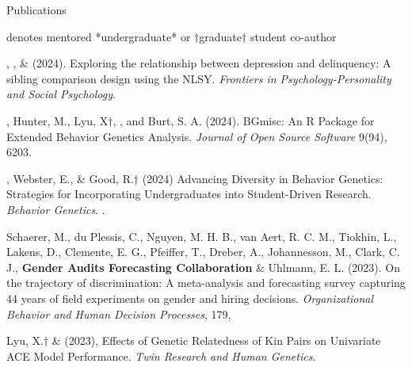 \begin{rSection}{\textrm{Publications}}%
\vspace{-1mm}\begin{center}\footnotesize{denotes mentored *undergraduate* or $\dagger$graduate$\dagger$ student co-author}\end{center}\vspace{-1mm}
\begin{etaremune}

\item \emsims, \jt, \& \meb (2024). Exploring the relationship between depression and delinquency: A sibling comparison design using the NLSY.  \textit{Frontiers in Psychology-Personality and Social Psychology}. 

\item \meb, Hunter, M., Lyu, X$\dagger$, \jdt, and Burt, S. A. (2024). BGmisc: An R Package for Extended Behavior Genetics Analysis. \textit{Journal of Open Source Software} 9(94), 6203. 
\item \meb, Webster, E.\noteA, \& Good, R.\noteA$\dagger$ (2024) Advancing Diversity in Behavior Genetics: Strategies for Incorporating Undergraduates into Student-Driven Research. \textit{Behavior Genetics}. . 
\item Schaerer, M., du Plessis, C., Nguyen, M. H. B., van Aert, R. C. M., Tiokhin, L., Lakens, D., Clemente, E. G., Pfeiffer, T., Dreber, A., Johannesson, M., Clark, C. J., \textbf{Gender Audits Forecasting Collaboration} \& Uhlmann, E. L. (2023). On the trajectory of discrimination: A meta-analysis and forecasting survey capturing 44 years of field experiments on gender and hiring decisions. \textit{Organizational Behavior and Human Decision Processes}, 179, 

\item Lyu, X.$\dagger$ \& \meb (2023), Effects of Genetic Relatedness of Kin Pairs on Univariate ACE Model Performance. \textit{Twin Research and Human Genetics}. 


\end{etaremune}
\end{rSection}
